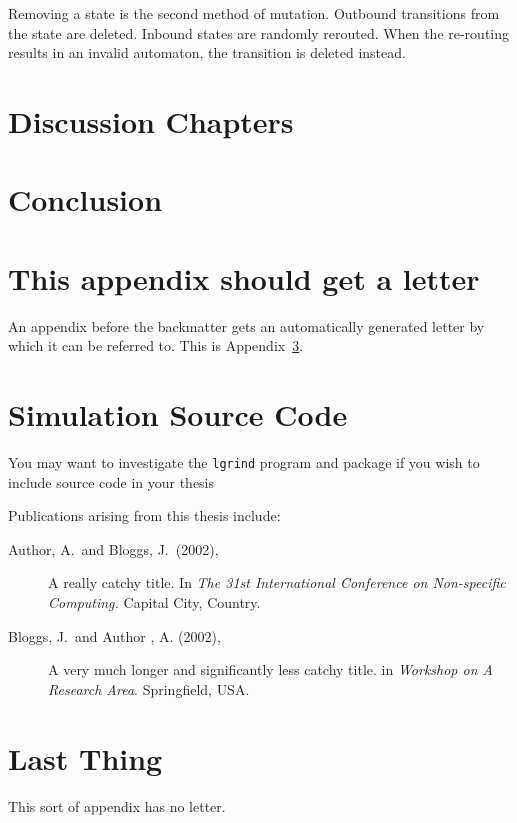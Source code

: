 \documentclass[a4paper,11pt,bcshonoursthesis,singlespace,twoside]{cssethesis}
\begin{document}
Removing a state is the second method of mutation. Outbound transitions from the state are deleted. 
Inbound states are randomly rerouted. When the re-routing results in an invalid automaton, the transition is deleted instead. 
\chapter{Discussion Chapters}

\chapter{Conclusion}

\appendix %


\chapter{This appendix should get a letter}
\label{app:example}
An appendix before the backmatter gets an automatically generated letter by
which it can be referred to. This is Appendix~\ref{app:example}.

\chapter{Simulation Source Code}
You may want to investigate the \texttt{lgrind} program and package if you
wish to include source code in your thesis


\backmatter						%
\begin{thesisauthorvita}
\begin{spacing}{1}
Publications arising from this thesis include:
\begin{description}
\item[Author, A.\ and Bloggs, J.\ (2002),]
A really catchy title. In \emph{The 31st International Conference
on Non-specific Computing.} Capital City, Country.
\item[Bloggs, J.\ and Author , A. (2002),]
A very much longer and significantly less catchy title. in \emph {Workshop on
A Research Area}. Springfield, USA.
\end{description}
\end{spacing}
\end{thesisauthorvita}


\chapter{Last Thing} %
This sort of appendix has no letter. 
\end{document}
